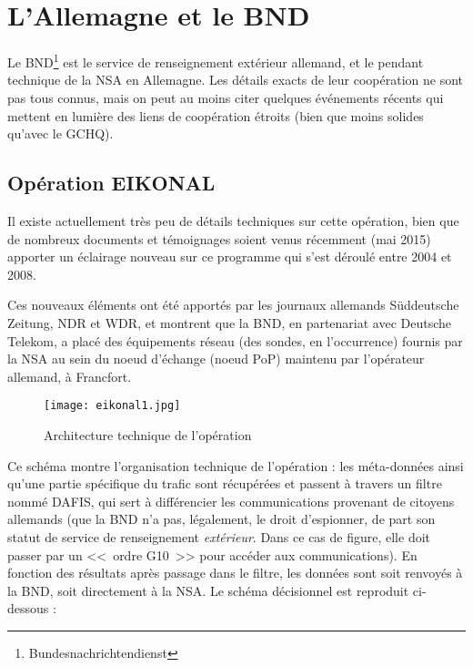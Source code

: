 \section{L'Allemagne et le BND}

Le BND\footnote{Bundesnachrichtendienst} est le service de
renseignement extérieur allemand, et le pendant technique de la NSA en
Allemagne. Les détails exacts de leur coopération ne sont pas tous connus, mais
on peut au moins citer quelques événements récents qui mettent en lumière des
liens de coopération étroits (bien que moins solides qu'avec le GCHQ).

\subsection{Opération EIKONAL}

Il existe actuellement très peu de détails techniques sur cette
opération, bien que de nombreux documents et témoignages soient venus récemment
(mai 2015) apporter un éclairage nouveau sur ce programme qui s'est déroulé entre 2004 et
2008.\newline

Ces nouveaux éléments ont été apportés par les journaux allemands
Süddeutsche Zeitung\cite{sudde}, NDR et WDR\cite{NDR}, et montrent que la BND,
en partenariat avec Deutsche Telekom, a placé des équipements réseau (des
sondes, en l'occurrence) fournis par la NSA au sein du noeud d'échange (noeud
PoP) maintenu par l'opérateur allemand, à Francfort.

\vspace{0.7cm}
\begin{figure}[h]
\centerline{\texttt{[image: eikonal1.jpg]}}
\caption[Architecture de l'opération EIKONAL]{Architecture
technique de l'opération}
\label{fig:eikonal1}
\end{figure}

Ce schéma montre l'organisation technique de l'opération : les
méta-données ainsi qu'une partie spécifique du trafic sont récupérées et passent
à travers un filtre nommé DAFIS\label{dafis}, qui sert à différencier les
communications provenant de citoyens allemands (que la BND n'a pas, légalement, le droit
d'espionner, de part son statut de service de renseignement \emph{extérieur}.
Dans ce cas de figure, elle doit passer par un <<~ordre G10~>> pour accéder
aux communications).
En fonction des résultats après passage dans le filtre, les données sont soit
renvoyés à la BND, soit directement à la NSA. Le schéma décisionnel est
reproduit ci-dessous :

